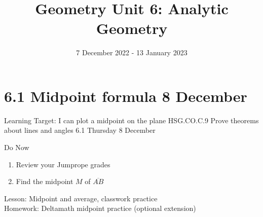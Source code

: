 

\newcommand\ticks{}
  \def\ticks{{Bar[scale=2]}-{Bar[scale=2]}}
\newcommand\paraticks{}
  \def\paraticks{{Straight Barb[reversed, scale=2]}-{Straight Barb[scale=2]}}

\title{Geometry Unit 6: Analytic Geometry}
\date{7 December 2022 - 13 January 2023}


\frame{\titlepage}
\section[Outline]{}
\frame{\tableofcontents}

\section{6.1 Midpoint formula \hfill 8 December \,}
\begin{frame}{Learning Target: I can plot a midpoint on the plane}
  {HSG.CO.C.9 Prove theorems about lines and angles  \hfill \alert{6.1 Thursday 8 December}}
  \begin{block}{Do Now}
    \begin{enumerate}
      \item Review your Jumprope grades
      \item Find the midpoint $M$ of $\overline{AB}$
    \end{enumerate}
    \begin{center}
    \end{center} 
  \end{block}
    Lesson: Midpoint and average, classwork practice \\
    Homework: Deltamath midpoint practice (optional extension)
\end{frame}

